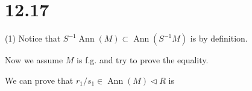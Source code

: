 \section{12.17}

(1) Notice that $S^{-1}\operatorname{Ann}(M)\subset \operatorname{Ann}(S^{-1}M)$ is by definition. 

Now we assume $M$ is f.g. and try to prove the equality.

We can prove that $r_1/s_1\in \operatorname{Ann}(M)\triangleleft R$ is 